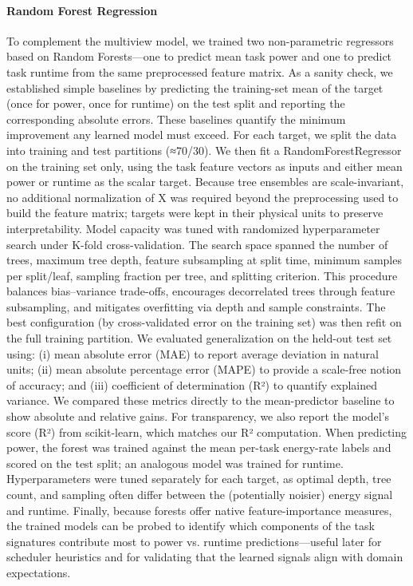\paragraph{Random Forest Regression}
\label{sec:random_forest_regression}
To complement the multiview model, we trained two non-parametric regressors based on Random Forests—one to predict mean task power and one to predict task runtime from the same preprocessed feature matrix. As a sanity check, we established simple baselines by predicting the training-set mean of the target (once for power, once for runtime) on the test split and reporting the corresponding absolute errors. These baselines quantify the minimum improvement any learned model must exceed.
For each target, we split the data into training and test partitions (≈70/30). We then fit a RandomForestRegressor on the training set only, using the task feature vectors as inputs and either mean power or runtime as the scalar target. Because tree ensembles are scale-invariant, no additional normalization of X was required beyond the preprocessing used to build the feature matrix; targets were kept in their physical units to preserve interpretability.
Model capacity was tuned with randomized hyperparameter search under K-fold cross-validation. The search space spanned the number of trees, maximum tree depth, feature subsampling at split time, minimum samples per split/leaf, sampling fraction per tree, and splitting criterion. This procedure balances bias–variance trade-offs, encourages decorrelated trees through feature subsampling, and mitigates overfitting via depth and sample constraints. The best configuration (by cross-validated error on the training set) was then refit on the full training partition.
We evaluated generalization on the held-out test set using: (i) mean absolute error (MAE) to report average deviation in natural units; (ii) mean absolute percentage error (MAPE) to provide a scale-free notion of accuracy; and (iii) coefficient of determination (R²) to quantify explained variance. We compared these metrics directly to the mean-predictor baseline to show absolute and relative gains. For transparency, we also report the model’s score (R²) from scikit-learn, which matches our R² computation.
When predicting power, the forest was trained against the mean per-task energy-rate labels and scored on the test split; an analogous model was trained for runtime. Hyperparameters were tuned separately for each target, as optimal depth, tree count, and sampling often differ between the (potentially noisier) energy signal and runtime. Finally, because forests offer native feature-importance measures, the trained models can be probed to identify which components of the task signatures contribute most to power vs. runtime predictions—useful later for scheduler heuristics and for validating that the learned signals align with domain expectations.

